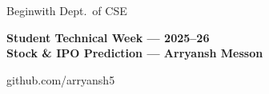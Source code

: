 \documentclass{article}
\newcommand{\sectionfont}{\fontsize{24}{28}\selectfont}
\newcommand{\bodyfont}{\fontsize{20}{24}\selectfont}
\begin{document}
\begin{tcolorbox}[
  colback=bwblue, colframe=bwblue,
  arc=0pt, boxrule=0pt,
  top=8pt, bottom=8pt, left=18pt, right=18pt,
  borderline north={4pt}{0pt}{gold},
  width=\linewidth,
]
  \begin{minipage}[c]{0.30\linewidth}
    \color{lgblue}\bodyfont Beginwith \quad Dept.\ of CSE
  \end{minipage}\hfill
  \begin{minipage}[c]{0.38\linewidth}\centering
    \color{gold}\sectionfont\bfseries Student Technical Week --- 2025--26\\[3pt]
    \color{white}\bodyfont Stock \& IPO Prediction --- Arryansh Messon
  \end{minipage}\hfill
  \begin{minipage}[c]{0.28\linewidth}\raggedleft
    \color{lgblue}\bodyfont github.com/arryansh5
  \end{minipage}
\end{tcolorbox}
\end{document}
